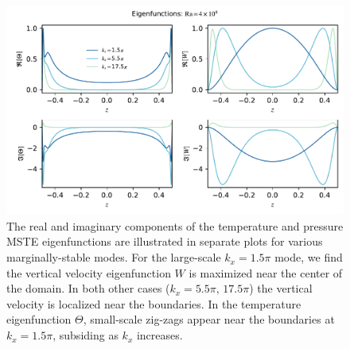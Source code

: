\documentclass[reprint,amsmath,amssymb,aps,nofootinbib]{revtex4-1}
\begin{document}
\begin{figure}
    \centering
    \includegraphics[width=7.1in]{grid_vars.pdf}
    \caption{The real and imaginary components of the temperature and pressure MSTE eigenfunctions are illustrated in separate plots for various marginally-stable modes. 
    For the large-scale $k_x = 1.5\pi$ mode, we find the vertical velocity eigenfunction $W$ is maximized near the center of the domain.
    In both other cases ($k_x = 5.5\pi, \, 17.5\pi$) the vertical velocity is localized near the boundaries.
    In the temperature eigenfunction $\Theta$, small-scale zig-zags appear near the boundaries at $k_x = 1.5\pi$, subsiding as $k_x$ increases.}%
    \label{fig:eigenfunctions}%
\end{figure}

\twocolumngrid
\clearpage
% 

\end{document}
